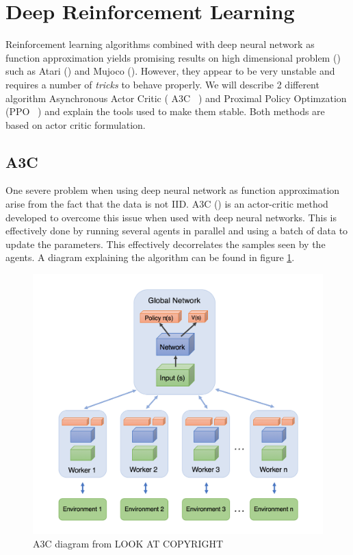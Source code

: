 \section{Deep Reinforcement Learning}
Reinforcement learning algorithms combined with deep neural network as function approximation yields promising results on high dimensional problem (\cite{mnih2013playing,mnih2016asynchronous,schulman2017proximal}) such as Atari (\cite{bellemare2013arcade}) and Mujoco (\cite{todorov2012mujoco}). However, they appear to be very unstable and requires a number of \emph{tricks} to behave properly. We will describe 2 different algorithm Asynchronous Actor Critic ( A3C ~\cite{mnih2016asynchronous}) and Proximal Policy Optimzation (PPO ~\cite{schulman2017proximal}) and explain the tools used to make them stable. Both methods are based on actor critic formulation. 
\subsection{A3C}
One severe problem when using deep neural network as function approximation arise from the fact that the data is not IID. A3C (\cite{mnih2016asynchronous}) is an actor-critic method developed to overcome this issue when used with deep neural networks. This is effectively done by running several agents in parallel and using a batch of data to update the parameters. This effectively decorrelates the samples seen by the agents. A diagram explaining the algorithm can be found in figure \ref{fig:a3c}.
\begin{figure}
    \centering
    \includegraphics[scale=0.25]{fig/A3C.png}
    \caption{A3C diagram from LOOK AT COPYRIGHT }
    \label{fig:a3c}
\end{figure}
